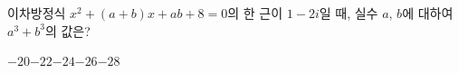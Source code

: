 이차방정식 $x^2+(a+b)x+ab+8=0$의 한 근이 $1-2i$일 때, 실수 $a$, $b$에 대하여 $a^3+b^3$의 값은?
\begin{choices32}{$-20$}{$-22$}{$-24$}{$-26$}{$-28$}\end{choices32}
